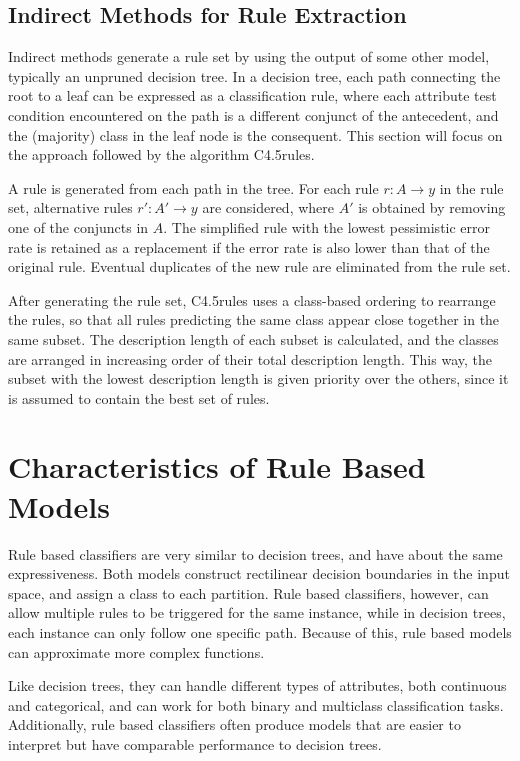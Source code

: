 \subsection{Indirect Methods for Rule Extraction}

Indirect methods generate a rule set by using the output of some other model, typically an unpruned decision tree. In a decision tree, each path connecting the root to a leaf can be expressed as a classification rule, where each attribute test condition encountered on the path is a different conjunct of the antecedent, and the (majority) class in the leaf node is the consequent. This section will focus on the approach followed by the algorithm C4.5rules.

A rule is generated from each path in the tree. For each rule $r : A \rightarrow{} y$ in the rule set, alternative rules $r' : A' \rightarrow{} y$ are considered, where $A'$ is obtained by removing one of the conjuncts in $A$. The simplified rule with the lowest pessimistic error rate is retained as a replacement if the error rate is also lower than that of the original rule. Eventual duplicates of the new rule are eliminated from the rule set.

After generating the rule set, C4.5rules uses a class-based ordering to rearrange the rules, so that all rules predicting the same class appear close together in the same subset. The description length of each subset is calculated, and the classes are arranged in increasing order of their total description length. This way, the subset with the lowest description length is given priority over the others, since it is assumed to contain the best set of rules.

\section{Characteristics of Rule Based Models}

Rule based classifiers are very similar to decision trees, and have about the same expressiveness. Both models construct rectilinear decision boundaries in the input space, and assign a class to each partition. Rule based classifiers, however, can allow multiple rules to be triggered for the same instance, while in decision trees, each instance can only follow one specific path. Because of this, rule based models can approximate more complex functions.

Like decision trees, they can handle different types of attributes, both continuous and categorical, and can work for both binary and multiclass classification tasks. Additionally, rule based classifiers often produce models that are easier to interpret but have comparable performance to decision trees.

